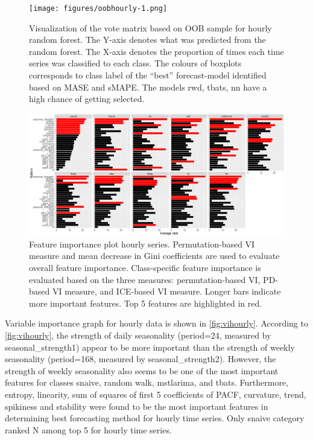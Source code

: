 \documentclass[11pt,a4paper,]{article}
\begin{document}
\begin{figure}
\centering
\texttt{[image: figures/oobhourly-1.png]}
\caption{\label{fig:oobhourly}Visualization of the vote matrix based on OOB
sample for hourly random forest. The Y-axis denotes what was predicted
from the random forest. The X-axis denotes the proportion of times each
time series was classified to each class. The colours of boxplots
corresponds to class label of the ``best'' forecast-model identified
based on MASE and sMAPE. The models rwd, tbats, nn have a high chance of
getting selected.}
\end{figure}

\begin{figure}
\centering
\includegraphics{figures/vihourly-1.png}
\caption{\label{fig:vihourly}Feature importance plot hourly series.
Permutation-based VI measure and mean decrease in Gini coefficients are
used to evaluate overall feature importance. Class-specific feature
importance is evaluated based on the three measures: permutation-based
VI, PD-based VI measure, and ICE-based VI measure. Longer bars indicate
more important features. Top 5 features are highlighted in red.}
\end{figure}

Variable importance graph for hourly data is shown in
\autoref{fig:vihourly}. According to \autoref{fig:vihourly}, the
strength of daily seasonality (period=24, measured by
seasonal\_strength1) appear to be more important than the strength of
weekly seasonality (period=168, measured by seasonal\_strength2).
However, the strength of weekly seasonality also seems to be one of the
most important features for classes snaive, random walk, mstlarima, and
tbats. Furthermore, entropy, linearity, sum of squares of first 5
coefficients of PACF, curvature, trend, spikiness and stability were
found to be the most important features in determining best forecasting
method for hourly time series. Only snaive category ranked N among top 5
for hourly time series.
\end{document}
